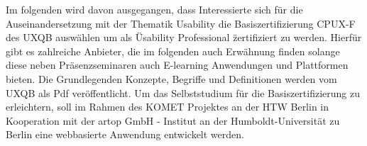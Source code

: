 \documentclass[a4paper, 12pt, twoside, BCOR=20mm, DIV=calc, abstracton, parskip=half*, toc=bibliography, toc=listof, headsepline, footsepline, headings=small, numbers=enddot]{scrreprt}
\begin{document}
Im folgenden wird davon ausgegangen, dass Interessierte sich für die Auseinandersetzung mit der Thematik Usability die Basiszertifizierung \ac{CPUX}-F des \ac{UXQB} auswählen um als \"Usability Professional \" zertifiziert zu werden. Hierfür gibt es zahlreiche Anbieter, die im folgenden auch Erwähnung finden solange diese neben Präsenzseminaren auch E-learning Anwendungen und Plattformen bieten. 
Die Grundlegenden Konzepte, Begriffe und Definitionen werden vom \ac{UXQB} als Pdf veröffentlicht\cite{cpux-f}. Um das Selbststudium für die Basiszertifizierung zu erleichtern, soll im Rahmen des KOMET Projektes an der \ac{HTW Berlin} %
in Kooperation mit der artop GmbH - Institut an der Humboldt-Universität zu Berlin eine webbasierte Anwendung entwickelt werden\cite{KOMET}. 



%
\end{document}
